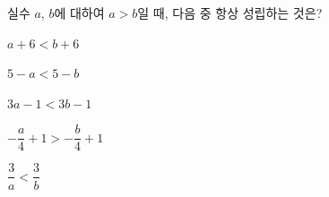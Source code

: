 실수 $a$, $b$에 대하여 $a>b$일 때, 다음 중 항상 성립하는 것은?
\begin{choicesii}{\rule[-3ex]{0pt}{8ex}$a+6<b+6$}{\rule[-3ex]{0pt}{8ex}$5-a<5-b$}{\rule[-3ex]{0pt}{8ex}$3a-1<3b-1$}{\rule[-3ex]{0pt}{8ex}$-\dfrac{a}{4}+1>-\dfrac{b}{4}+1$}{\rule[-3ex]{0pt}{8ex}$\dfrac{3}{a}<\dfrac{3}{b}$}\end{choicesii}
